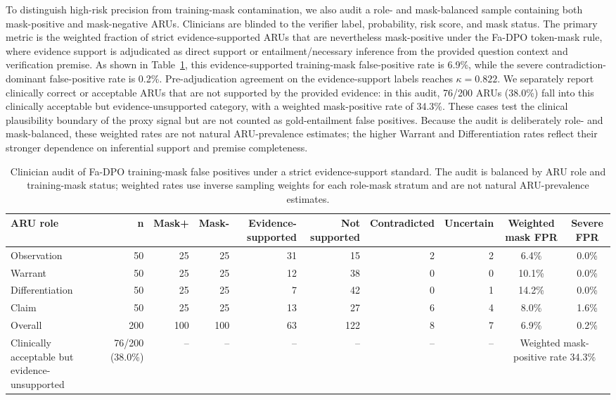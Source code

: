 \documentclass[a4paper,fleqn,doubleblind]{cas-sc}
\begin{document}
To distinguish high-risk precision from training-mask contamination, we also audit a role- and mask-balanced sample containing both mask-positive and mask-negative ARUs. Clinicians are blinded to the verifier label, probability, risk score, and mask status. The primary metric is the weighted fraction of strict evidence-supported ARUs that are nevertheless mask-positive under the Fa-DPO token-mask rule, where evidence support is adjudicated as direct support or entailment/necessary inference from the provided question context and verification premise. As shown in Table~\ref{tab:training_mask_fp_audit}, this evidence-supported training-mask false-positive rate is 6.9\%, while the severe contradiction-dominant false-positive rate is 0.2\%. Pre-adjudication agreement on the evidence-support labels reaches $\kappa=0.822$. We separately report clinically correct or acceptable ARUs that are not supported by the provided evidence: in this audit, 76/200 ARUs (38.0\%) fall into this clinically acceptable but evidence-unsupported category, with a weighted mask-positive rate of 34.3\%. These cases test the clinical plausibility boundary of the proxy signal but are not counted as gold-entailment false positives. Because the audit is deliberately role- and mask-balanced, these weighted rates are not natural ARU-prevalence estimates; the higher Warrant and Differentiation rates reflect their stronger dependence on inferential support and premise completeness.

\begin{table}[htbp]
    \centering
    \caption{Clinician audit of Fa-DPO training-mask false positives under a strict evidence-support standard. The audit is balanced by ARU role and training-mask status; weighted rates use inverse sampling weights for each role-mask stratum and are not natural ARU-prevalence estimates.}
    \label{tab:training_mask_fp_audit}
    \begin{adjustbox}{max width=\textwidth}
    \begin{tabular}{lrrrrrrrcc}
        \toprule
        \textbf{ARU role} & \textbf{n} & \textbf{Mask+} & \textbf{Mask-} & \textbf{Evidence-supported} & \textbf{Not supported} & \textbf{Contradicted} & \textbf{Uncertain} & \textbf{Weighted mask FPR} & \textbf{Severe FPR} \\
        \midrule
        Observation & 50 & 25 & 25 & 31 & 15 & 2 & 2 & 6.4\% & 0.0\% \\
        Warrant & 50 & 25 & 25 & 12 & 38 & 0 & 0 & 10.1\% & 0.0\% \\
        Differentiation & 50 & 25 & 25 & 7 & 42 & 0 & 1 & 14.2\% & 0.0\% \\
        Claim & 50 & 25 & 25 & 13 & 27 & 6 & 4 & 8.0\% & 1.6\% \\
        \midrule
        Overall & 200 & 100 & 100 & 63 & 122 & 8 & 7 & 6.9\% & 0.2\% \\
        Clinically acceptable but evidence-unsupported & 76/200 (38.0\%) & -- & -- & -- & -- & -- & -- & \multicolumn{2}{c}{Weighted mask-positive rate 34.3\%} \\
        \bottomrule
    \end{tabular}
    \end{adjustbox}
\end{table}
\end{document}
